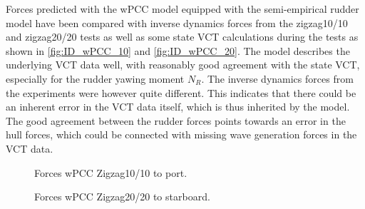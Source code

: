 Forces predicted with the wPCC model equipped with the semi-empirical rudder model have been compared with inverse dynamics forces from the zigzag10/10 and zigzag20/20 tests as well as some state VCT calculations during the tests as shown in \autoref{fig:ID_wPCC_10} and \autoref{fig:ID_wPCC_20}. The model describes the underlying VCT data well, with reasonably good agreement with the state VCT, especially for the rudder yawing moment $N_R$. The inverse dynamics forces from the experiments were however quite different. This indicates that there could be an inherent error in the VCT data itself, which is thus inherited by the model. The good agreement between the rudder forces points towards an error in the hull forces, which could be connected with missing wave generation forces in the VCT data.  
\begin{figure}[h]
     \centering
     
     \caption{Forces wPCC Zigzag10/10 to port.}
     \label{fig:ID_wPCC_10}
\end{figure}
\begin{figure}[h]
    
    \caption{Forces wPCC Zigzag20/20 to starboard.}
    \label{fig:ID_wPCC_20}
\end{figure}
%         
%         
